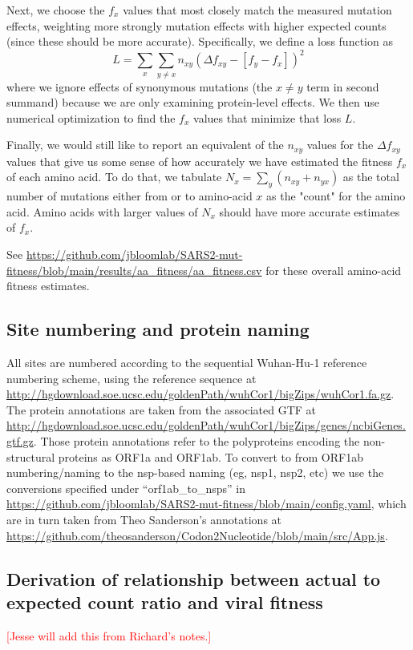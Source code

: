 \documentclass[9pt,twocolumn,twoside]{gsajnl_modified}
\newcommand\jdbcomment[1]{\textcolor{red}{[#1]}}
\begin{document}
{Next, we choose the $f_x$ values that most closely match the measured mutation effects, weighting more strongly mutation effects with higher expected counts (since these should be more accurate).
Specifically, we define a loss function as
$$
L = \sum_x \sum_{y \ne x} n_{xy} \left(\Delta f_{xy} - \left[f_y - f_x\right]\right)^2
$$
where we ignore effects of synonymous mutations (the $x \ne y$ term in second summand) because we are only examining protein-level effects.
We then use numerical optimization to find the $f_x$ values that minimize that loss $L$.

Finally, we would still like to report an equivalent of the $n_{xy}$ values for the $\Delta f_{xy}$ values that give us some sense of how accurately we have estimated the fitness $f_x$ of each amino acid.
To do that, we tabulate $N_x = \sum_y \left(n_{xy} + n_{yx} \right)$ as the total number of mutations either from or to amino-acid $x$ as the "count" for the amino acid.
Amino acids with larger values of $N_x$ should have more accurate estimates of $f_x$.

See \url{https://github.com/jbloomlab/SARS2-mut-fitness/blob/main/results/aa_fitness/aa_fitness.csv} for these overall amino-acid fitness estimates.

\subsection{Site numbering and protein naming}
All sites are numbered according to the sequential Wuhan-Hu-1 reference numbering scheme, using the reference sequence at \url{http://hgdownload.soe.ucsc.edu/goldenPath/wuhCor1/bigZips/wuhCor1.fa.gz}.
The protein annotations are taken from the associated GTF at \url{http://hgdownload.soe.ucsc.edu/goldenPath/wuhCor1/bigZips/genes/ncbiGenes.gtf.gz}.
Those protein annotations refer to the polyproteins encoding the non-structural proteins as ORF1a and ORF1ab.
To convert to from ORF1ab numbering/naming to the nsp-based naming (eg, nsp1, nsp2, etc) we use the conversions specified under ``orf1ab\_to\_nsps'' in \url{https://github.com/jbloomlab/SARS2-mut-fitness/blob/main/config.yaml}, which are in turn taken from Theo Sanderson's annotations at \url{https://github.com/theosanderson/Codon2Nucleotide/blob/main/src/App.js}.

\subsection{Derivation of relationship between actual to expected count ratio and viral fitness}
\jdbcomment{Jesse will add this from Richard's notes.}


}
\end{document}
